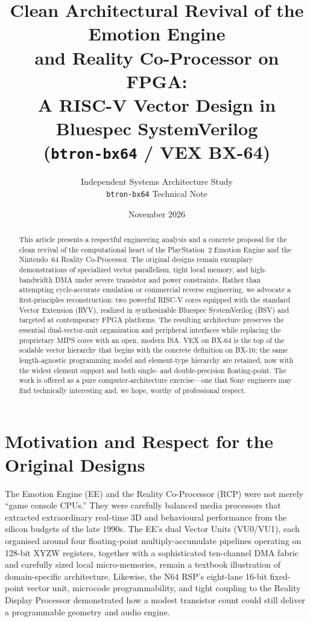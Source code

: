 \documentclass[11pt,a4paper]{article}
\title{\textbf{Clean Architectural Revival of the Emotion Engine\\
and Reality Co-Processor on FPGA:\\
A RISC-V Vector Design in Bluespec SystemVerilog\\
(\texttt{btron-bx64} / VEX BX-64)}}
\author{
  Independent Systems Architecture Study\\
  \texttt{btron-bx64} Technical Note
}
\date{November 2026}
\begin{document}
\maketitle

\begin{abstract}
This article presents a respectful engineering analysis and a concrete proposal for the clean revival of the computational heart of the PlayStation~2 Emotion Engine and the Nintendo~64 Reality Co-Processor. The original designs remain exemplary demonstrations of specialized vector parallelism, tight local memory, and high-bandwidth DMA under severe transistor and power constraints. Rather than attempting cycle-accurate emulation or commercial reverse engineering, we advocate a first-principles reconstruction: two powerful RISC-V cores equipped with the standard Vector Extension (RVV), realized in synthesizable Bluespec SystemVerilog (BSV) and targeted at contemporary FPGA platforms. The resulting architecture preserves the essential dual-vector-unit organization and peripheral interfaces while replacing the proprietary MIPS cores with an open, modern ISA. VEX on BX-64 is the top of the scalable vector hierarchy that begins with the concrete definition on BX-16; the same length-agnostic programming model and element-type hierarchy are retained, now with the widest element support and both single- and double-precision floating-point. The work is offered as a pure computer-architecture exercise---one that Sony engineers may find technically interesting and, we hope, worthy of professional respect.
\end{abstract}

\section{Motivation and Respect for the Original Designs}

The Emotion Engine (EE) and the Reality Co-Processor (RCP) were not merely ``game console CPUs.'' They were carefully balanced media processors that extracted extraordinary real-time 3D and behavioural performance from the silicon budgets of the late 1990s. The EE's dual Vector Units (VU0/VU1), each organised around four floating-point multiply-accumulate pipelines operating on 128-bit XYZW registers, together with a sophisticated ten-channel DMA fabric and carefully sized local micro-memories, remain a textbook illustration of domain-specific architecture. Likewise, the N64 RSP's eight-lane 16-bit fixed-point vector unit, microcode programmability, and tight coupling to the Reality Display Processor demonstrated how a modest transistor count could still deliver a programmable geometry and audio engine.
\end{document}
